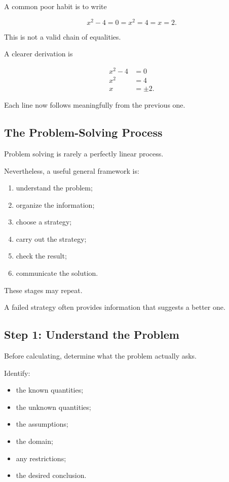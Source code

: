 A common poor habit is to write

\[ x^2-4=0=x^2=4=x=2. \]

This is not a valid chain of equalities.

A clearer derivation is

\[
\begin{aligned}
x^2-4&=0\\
x^2&=4\\
x&=\pm2.
\end{aligned}
\]

Each line now follows meaningfully from the previous one.

\subsection{The Problem-Solving Process}
\label{subsec:problem-solving-process}

Problem solving is rarely a perfectly linear process.

Nevertheless, a useful general framework is:

\begin{enumerate}
    \item understand the problem;
    \item organize the information;
    \item choose a strategy;
    \item carry out the strategy;
    \item check the result;
    \item communicate the solution.
\end{enumerate}

These stages may repeat.

A failed strategy often provides information that suggests a better one.

\subsection{Step 1: Understand the Problem}
\label{subsec:understand-problem}

Before calculating, determine what the problem actually asks.

Identify:

\begin{itemize}
    \item the known quantities;
    \item the unknown quantities;
    \item the assumptions;
    \item the domain;
    \item any restrictions;
    \item the desired conclusion.
\end{itemize}

